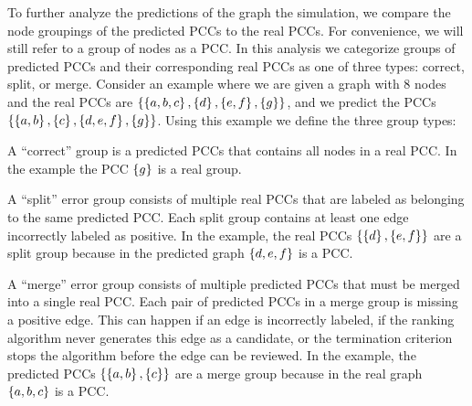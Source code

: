     To further analyze the predictions of the graph the simulation, we compare the node groupings of the
      predicted PCCs to the real \groundtruth{} PCCs.
    For convenience, we will still refer to a group of nodes as a PCC.
    In this analysis we categorize groups of predicted PCCs and their corresponding real PCCs as one of three
      types:
    correct, split, or merge.
    Consider an example where we are given a graph with $8$ nodes and the real PCCs are %
    $\left\{\left\{a, b, c\right\}, \left\{d\right\}, \left\{e, f\right\}, \left\{g\right\}\right\}$, and we predict the PCCs %
    $\left\{\left\{a, b\right\}, \left\{c\right\}, \left\{d, e, f\right\}, \left\{g\right\}\right\}$.
    Using this example we define the three group types:
    \begin{enumln}
        \item A ``correct'' group is a predicted PCCs that contains all nodes in a real PCC.
        In the example the PCC $\left\{g\right\}$ is a real group.
        
        \item A ``split'' error group consists of multiple real PCCs that are labeled as belonging to the same
          predicted PCC.
        Each split group contains at least one edge incorrectly labeled as positive.
        In the example, the real PCCs $\left\{\left\{d\right\}, \left\{e, f\right\}\right\}$ are a split group because in the
          predicted graph $\left\{d, e, f\right\}$ is a PCC.
      
        \item A ``merge'' error group consists of multiple predicted PCCs that must be merged into a single real
          PCC.
        Each pair of predicted PCCs in a merge group is missing a positive edge.
        This can happen if an edge is incorrectly labeled, if the ranking algorithm never generates this edge as
          a candidate, or the termination criterion stops the algorithm before the edge can be reviewed.
        In the example, the predicted PCCs $\left\{\left\{a, b\right\}, \left\{c\right\}\right\}$ are a merge group because in the
          real graph $\left\{a, b, c\right\}$ is a PCC.
        
    \end{enumln}
